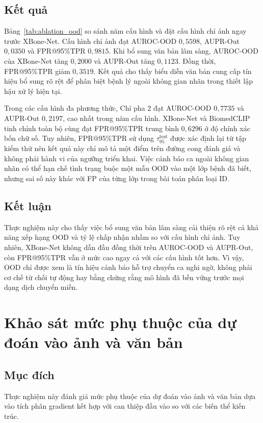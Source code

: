 \subsection{Kết quả}
Bảng~\ref{tab:ablation_ood} so sánh năm cấu hình và đặt cấu hình chỉ ảnh ngay trước XBone-Net. Cấu hình chỉ ảnh đạt AUROC-OOD $0{,}5598$, AUPR-Out $0{,}0350$ và FPR@95\%TPR $0{,}9815$. Khi bổ sung văn bản lâm sàng, AUROC-OOD của XBone-Net tăng $0{,}2000$ và AUPR-Out tăng $0{,}1123$. Đồng thời, FPR@95\%TPR giảm $0{,}3519$. Kết quả cho thấy biểu diễn văn bản cung cấp tín hiệu bổ sung rõ rệt để phân biệt bệnh lý ngoài không gian nhãn trong thiết lập hậu xử lý hiện tại.

Trong các cấu hình đa phương thức, Chỉ pha 2 đạt AUROC-OOD $0{,}7735$ và AUPR-Out $0{,}2197$, cao nhất trong năm cấu hình. XBone-Net và BiomedCLIP tinh chỉnh toàn bộ cùng đạt FPR@95\%TPR trung bình $0{,}6296$ ở độ chính xác bốn chữ số. Tuy nhiên, FPR@95\%TPR sử dụng $\tau_{95}^{\mathrm{test}}$ được xác định lại từ tập kiểm thử nên kết quả này chỉ mô tả một điểm trên đường cong đánh giá và không phải hành vi của ngưỡng triển khai. Việc cảnh báo ca ngoài không gian nhãn có thể hạn chế tình trạng buộc một mẫu OOD vào một lớp bệnh đã biết, nhưng sai số này khác với FP của từng lớp trong bài toán phân loại ID.



\subsection{Kết luận}
Thực nghiệm này cho thấy việc bổ sung văn bản lâm sàng cải thiện rõ rệt cả khả năng xếp hạng OOD và tỷ lệ chấp nhận nhầm so với cấu hình chỉ ảnh. Tuy nhiên, XBone-Net không dẫn đầu đồng thời trên AUROC-OOD và AUPR-Out, còn FPR@95\%TPR vẫn ở mức cao ngay cả với các cấu hình tốt hơn. Vì vậy, OOD chỉ được xem là tín hiệu cảnh báo hỗ trợ chuyển ca nghi ngờ, không phải cơ chế từ chối tự động hay bằng chứng rằng mô hình đã bền vững trước mọi dạng dịch chuyển miền.

\section{Khảo sát mức phụ thuộc của dự đoán vào ảnh và văn bản}
\label{subsec:ablation_explainability_results}

\subsection{Mục đích}
Thực nghiệm này đánh giá mức phụ thuộc của dự đoán vào ảnh và văn bản dựa vào tích phân gradient kết hợp với can thiệp đầu vào so với các biến thể kiến trúc.


